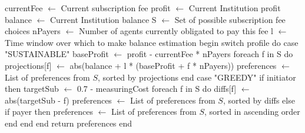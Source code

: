 
\begin{pseudocode}[label=alg:subvote,caption={Subscription voting algorithm.}]
currentFee $\leftarrow$ Current subscription fee
profit $\leftarrow$ Current Institution profit
balance $\leftarrow$ Current Institution balance
S $\leftarrow$ Set of possible subscription fee choices
nPayers $\leftarrow$ Number of agents currently obligated to pay this fee
l $\leftarrow$ Time window over which to make balance estimation
begin
	switch profile do
		case "SUSTAINABLE"
			baseProfit $\leftarrow$ profit - currentFee * nPayers
			foreach f in S do
				projections[f] $\leftarrow$ abs(balance + l * (baseProfit + f * nPayers))
			preferences $\leftarrow$ List of preferences from $S$, sorted by projections
		end
		case "GREEDY"
			if initiator then
				targetSub $\leftarrow$ 0.7 - measuringCost
				foreach f in S do
					diffs[f] $\leftarrow$ abs(targetSub - f)
				preferences $\leftarrow$ List of preferences from $S$, sorted by diffs
			else if payer then
				preferences $\leftarrow$ List of preferences from $S$, sorted in ascending order
			end
		end
	end
	return preferences
end
\end{pseudocode}

